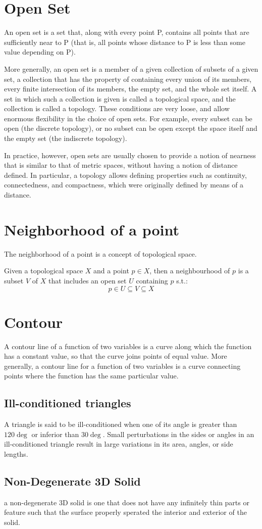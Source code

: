 \section{Open Set}
An open set is a set that, along with every point P, contains all points that are sufficiently near to P (that is, all points whose distance to P is less than some value depending on P).\par
More generally, an open set is a member of a given collection of subsets of a given set, a collection that has the property of containing every union of its members, every finite intersection of its members, the empty set, and the whole set itself. A set in which such a collection is given is called a topological space, and the collection is called a topology. These conditions are very loose, and allow enormous flexibility in the choice of open sets. For example, every subset can be open (the discrete topology), or no subset can be open except the space itself and the empty set (the indiscrete topology).\par
In practice, however, open sets are usually chosen to provide a notion of nearness that is similar to that of metric spaces, without having a notion of distance defined. In particular, a topology allows defining properties such as continuity, connectedness, and compactness, which were originally defined by means of a distance. 

\section{Neighborhood of a point}
The neighborhood of a point is a concept of topological space.\par
Given a topological space $X$ and a point $p \in X$, then a neighbourhood of $p$ is a subset $V$ of $X$ that includes an open set $U$ containing $p$ s.t.:
\begin{equation*}
    p \in U \subseteq V \subseteq X
\end{equation*}

\section{Contour}
A contour line of a function of two variables is a curve along which the function has a constant value, so that the curve joins points of equal value. More generally, a contour line for a function of two variables is a curve connecting points where the function has the same particular value.

\subsection{Ill-conditioned triangles}
A triangle is said to be ill-conditioned when one of its angle is greater than $120 \deg$ or inferior than $30 \deg$. Small perturbations in the sides or angles in an ill-conditioned triangle result in large variations in its area, angles, or side lengths. 

\subsection{Non-Degenerate 3D Solid}
a non-degenerate 3D solid is one that does not have any infinitely thin parts or feature such that the surface properly sperated the interior and exterior of the solid.

